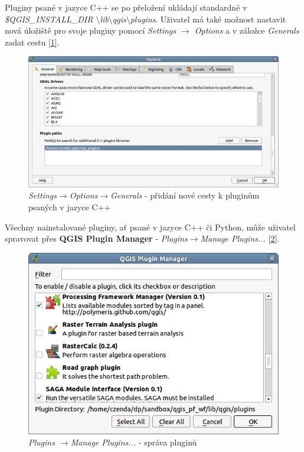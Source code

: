 \noindent Pluginy psané v jazyce C++ se po přeložení ukládají standardně v \textit{\$QGIS\_INSTALL\_DIR $\setminus$lib$\setminus$qgis$\setminus$plugins}. Uživatel má také možnost nastavit nová úložiště pro svoje pluginy pomocí \textit{Settings $\rightarrow$ Options} a v záložce \textit{Generals} zadat cestu [\figurename \ref{cpprepository}]. \\

\begin{figure}[h]
	\centering
	\includegraphics[scale=0.5]{pictures/qgis_plugin/options_cpp_path}
	\caption{\textit{Settings$\rightarrow$Options$\rightarrow$Generals} - přidání nové cesty k pluginům psaných v jazyce C++}
  	\label{cpprepository}
\end{figure}

Všechny nainstalované pluginy, ať psané v jazyce C++ či Python, může
uživatel spravovat přes \textbf{QGIS Plugin Manager}
- \textit{Plugins$\rightarrow$Manage Plugins...}
[\figurename \ref{plugin_manager}].

\begin{figure}[h]
	\centering
	\includegraphics[scale=0.5]{pictures/qgis_plugin/plugin_manager}
	\caption{\textit{Plugins $\rightarrow$Manage Plugins...} - správa pluginů}
  	\label{plugin_manager}
\end{figure}

